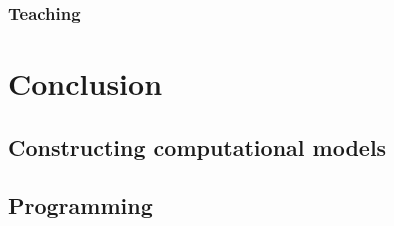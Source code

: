 \documentclass{msuphddissertation}
\begin{document}
\begin{doublespace}


\subsection{Teaching}




%
%

\chapter{Conclusion}\label{CH7:Conclusion}

%
%

\appendices\label{Appendix}

\section*{Constructing computational models}

\section*{Programming}

%
%

\end{doublespace}



\end{document}
